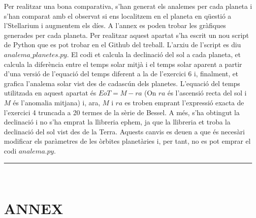 \documentclass[a4paper, 11pt]{article}
\begin{document}
\noindent Per realitzar una bona comparativa, s'han generat els analemes per cada planeta i s'han comparat amb el observat si ens localitzem en el planeta en qüestió a l'Stellarium i augmentem els díes. A l'annex es poden trobar les gràfiques generades per cada planeta. Per realitzar aquest apartat s'ha escrit un nou script de Python que es pot trobar en el Github del treball. L'arxiu de l'script es diu $analema\_planetes.py$. El codi et calcula la declinació del sol a cada planeta, et calcula la diferència entre el temps solar mitjà i el temps solar aparent a partir d'una versió de l'equació del temps diferent a la de l'exercici 6 i, finalment, et grafica l'analema solar vist des de cadascún dels planetes. L'equació del temps utilitzada en aquest apartat és $EoT = M - ra$ (On $ra$ és l'ascensió recta del sol i $M$ és l'anomalia mitjana) i, ara, $M$ i $ra$ es troben emprant l'expressió exacta de l'exercici 4 truncada a 20 termes de la sèrie de Bessel. A més, s'ha obtingut la declinació i no s'ha emprat la llibreria ephem, ja que la llibreria et troba la declinació del sol vist des de la Terra. Aquests canvis es deuen a que és necesàri modificar els paràmetres de les òrbites planetàries i, per tant, no es pot emprar el codi $analema.py$.

\vspace{2mm}

\noindent 

\vspace{10mm}
\hrule\
\vspace{5mm}


\newpage
\section*{ANNEX}
\end{document}
